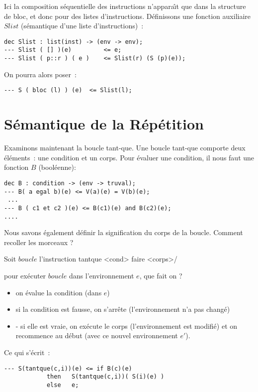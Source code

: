 Ici la composition séquentielle des instructions n'appara\^{\i}t que
dans la structure de bloc, et donc pour des listes
d'instructions. Définissons une fonction auxiliaire $Slist$ (sémantique
d'une liste d'instructions)~:

\begin{verbatim}
dec Slist : list(inst) -> (env -> env);
--- Slist ( [] )(e) 		<= e;
--- Slist ( p::r ) ( e )	<= Slist(r) (S (p)(e));
\end{verbatim}

On pourra alors poser~:

\begin{verbatim}
--- S ( bloc (l) ) (e) 	<= Slist(l);
\end{verbatim}


\section{Sémantique de la Répétition}

Examinons maintenant la boucle tant-que. Une boucle tant-que comporte
deux éléments~: une condition et un corps. Pour évaluer une condition,
il nous faut une fonction $B$ (booléenne):

\begin{verbatim}
dec B : condition -> (env -> truval);
--- B( a egal b)(e) <= V(a)(e) = V(b)(e);
 ...
--- B ( c1 et c2 )(e) <= B(c1)(e) and B(c2)(e);
....
\end{verbatim}

Nous savons également définir la signification du corps de la boucle. Comment recoller les morceaux ?

Soit $boucle$ l'instruction tantque <cond> faire <corps>/

pour exécuter $boucle$ dans l'environnement $e$, que fait on ?
\begin{itemize}
\item  on évalue la condition (dans $e$)
\item si la condition est fausse, on s'arr\^ete (l'environnement n'a pas changé)
\item- si elle est vraie, on exécute le corps (l'environnement est
modifié) et on recommence au début (avec ce nouvel environnement
$e'$).
\end{itemize}

Ce qui s'écrit~: 

\begin{verbatim}
--- S(tantque(c,i))(e) <= if B(c)(e)
			then   S(tantque(c,i))( S(i)(e) )
			else   e;
\end{verbatim}


